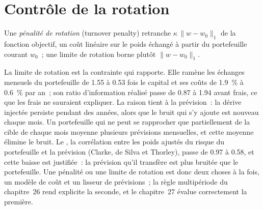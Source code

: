 \section{Contrôle de la rotation}

\begin{definition}\label{def:rs:portfolio-construction-i:turnover}
Une \emph{pénalité de rotation} (turnover penalty) retranche $\kappa\,\lVert w - w_0\rVert_1$ de la fonction objectif, un coût linéaire sur le poids échangé à partir du
portefeuille courant $w_0$~; une limite de rotation borne plutôt $\lVert w - w_0\rVert_1$.
\end{definition}

La limite de rotation est la contrainte qui rapporte. Elle ramène les échanges mensuels du portefeuille de 1.55 à 0.53 fois le capital et ses coûts de 1.9~\% à 0.6~\% par an~; son
ratio d'information réalisé passe de 0.87 à 1.94 avant frais, ce que les frais ne sauraient expliquer. La raison tient à la prévision~: la dérive injectée persiste pendant des années,
alors que le bruit qui s'y ajoute est nouveau chaque mois. Un portefeuille qui ne peut se rapprocher que partiellement de la cible de chaque mois moyenne plusieurs prévisions mensuelles, et
cette moyenne élimine le bruit. Le , la corrélation entre les poids ajustés du risque du portefeuille et la prévision (Clarke, de Silva et Thorley), passe
de 0.97 à 0.58, et cette baisse est justifiée~: la prévision qu'il transfère est plus bruitée que le portefeuille. Une pénalité ou une limite de rotation est donc deux choses à la fois, un modèle de coût
et un lisseur de prévisions~; la règle multipériode du chapitre~26 rend explicite la seconde, et le chapitre~27 évalue correctement la première.

